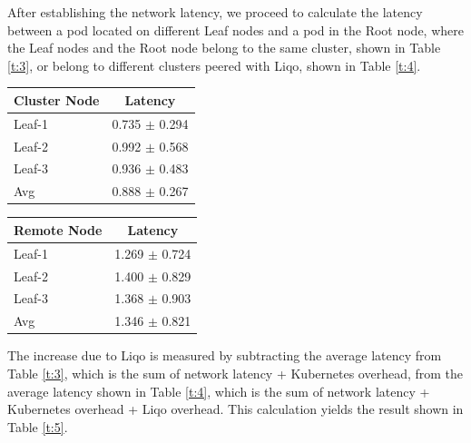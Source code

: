 After establishing the network latency, we proceed to calculate the latency between a pod located on different Leaf nodes and a pod in the Root node, where the Leaf nodes and the Root node belong to the same cluster, shown in Table \ref{t:3}, or belong to different clusters peered with Liqo, shown in Table \ref{t:4}.

\begin{minipage}{0.45\textwidth}
  \centering
  \vspace{0.5cm}
  \begin{tabular}{|l|c|}
  \hline
  \textbf{Cluster Node} & \textbf{Latency}  \\ 
  \hline
  Leaf-1 & 0.735 $\pm$ 0.294  \\
  \hline
  Leaf-2 & 0.992 $\pm$ 0.568 \\
  \hline
  Leaf-3 & 0.936 $\pm$ 0.483 \\
  \hline
  Avg & 0.888 $\pm$ 0.267 \\
  \hline
  \end{tabular}
  \label{t:3}\vspace{0.5cm}
\end{minipage}%
\hspace{0.05\textwidth} %
\begin{minipage}{0.45\textwidth}
  \centering
  \vspace{0.5cm}
  \begin{tabular}{|l|c|}
  \hline
  \textbf{Remote Node} & \textbf{Latency}  \\ 
  \hline
  Leaf-1 & 1.269 $\pm$ 0.724  \\
  \hline
  Leaf-2 & 1.400 $\pm$ 0.829 \\
  \hline
  Leaf-3 & 1.368 $\pm$ 0.903 \\
  \hline
  Avg & 1.346 $\pm$ 0.821 \\
  \hline
  \end{tabular}
  \label{t:4}\vspace{0.5cm}
\end{minipage}

The increase due to Liqo is measured by subtracting the average latency from Table \ref{t:3}, which is the sum of network latency + Kubernetes overhead, from the average latency shown in Table \ref{t:4}, which is the sum of network latency + Kubernetes overhead + Liqo overhead. This calculation yields the result shown in Table \ref{t:5}.

